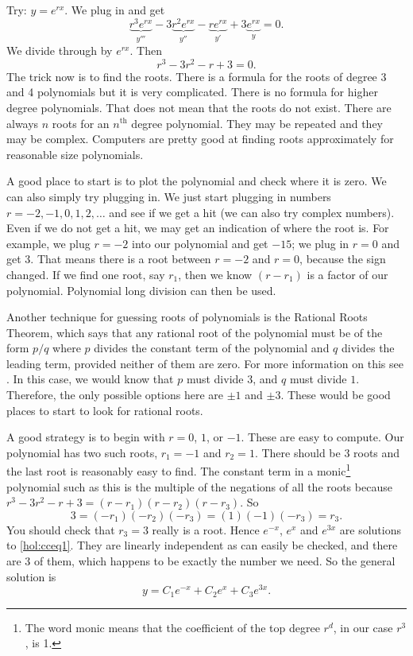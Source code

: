 \begin{exampleSol}
Try: $y = e^{rx}$.  We plug in and get
\begin{equation*}
\underbrace{r^3 e^{rx}}_{y'''} - 3 \underbrace{r^2 e^{rx}}_{y''} -
\underbrace{r e^{rx}}_{y'} + 3 \underbrace{e^{rx}}_{y} = 0 .
\end{equation*}
We divide through by $e^{rx}$.  Then 
\begin{equation*}
r^3 - 3 r^2 - r + 3 = 0 .
\end{equation*}
The trick now is to find the roots.  There is a formula for the roots of
degree 3 and 4 polynomials but it is very complicated.  There is no formula
for higher degree polynomials.  That does not mean that the roots do not
exist.  There are always
$n$ roots for an $n^{\text{th}}$ degree polynomial.  They may be
repeated
and they may be complex.  Computers are pretty good at finding roots
approximately for reasonable size polynomials.

A good place to start is to plot the polynomial and check where it is zero.
We can also simply try plugging in.  We
just start plugging
in numbers $r=-2,-1,0,1,2,\ldots$ and see if we get a hit (we can also
try complex numbers).  Even
if we do not get a hit, we may get an indication
of where the root is.  For example, we plug
$r=-2$ into our polynomial and get $-15$; we plug in $r=0$ and get 3.
That means there is a root between $r=-2$ and $r=0$,
because the sign changed.
If we find one root, say $r_1$, then we know $(r-r_1)$ is a factor
of our polynomial.  Polynomial long division can then be used. 

Another technique for guessing roots of polynomials is the Rational Roots Theorem, which says that any rational root of the polynomial must be of the form $p/q$ where $p$ divides the constant term of the polynomial and $q$ divides the leading term, provided neither of them are zero. For more information on this see . In this case, we would know that $p$ must divide $3$, and $q$ must divide $1$. Therefore, the only possible options here are $\pm 1$ and $\pm 3$. These would be good places to start to look for rational roots. 

A good strategy is to begin with $r=0$, $1$, or $-1$.  These are
easy to compute.  Our polynomial has
two such roots, $r_1 = -1$
and $r_2 = 1$.  There should be 3 roots and the last root is reasonably
easy to find.  The constant
term in a monic\footnote{The word monic means that the coefficient of the
top degree $r^d$, in our case $r^3$, is 1.}
polynomial such as this is the multiple of the negations of all the roots
because $r^3 - 3 r^2 - r + 3 = (r-r_1)(r-r_2)(r-r_3)$.
So
\begin{equation*}
3 = (-r_1)(-r_2)(-r_3) = (1)(-1)(-r_3) = r_3 .
\end{equation*}
You should check that $r_3 = 3$ really
is a root.  Hence $e^{-x}$, $e^{x}$
and $e^{3x}$ are solutions to \eqref{hol:cceq1}.  They are linearly independent
as can easily be checked, and there are 3 of them, which happens to be exactly
the number we need.  So the general solution is
\begin{equation*}
y = C_1 e^{-x} + C_2 e^{x} + C_3 e^{3x} .
\end{equation*}


\end{exampleSol}
